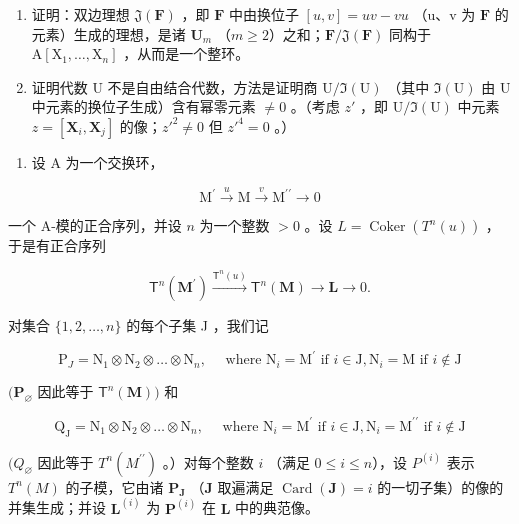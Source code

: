 \begin{enumerate}
\def\labelenumi{(\alph{enumi})}
\setcounter{enumi}{3}
\item
  证明：双边理想 \(\mathfrak{J}(\mathbf{F})\) ，即 \(\mathbf{F}\) 中由换位子 \([u,v] = uv - vu\) （u、v 为 \(\mathbf{F}\) 的元素）生成的理想，是诸 \(\mathbf{U}_m\) （\(m\geqslant 2\)）之和；\(\mathbf{F} / \mathfrak{J}(\mathbf{F})\) 同构于 \(\mathrm{A}[\mathrm{X}_1,\dots ,\mathrm{X}_n]\) ，从而是一个整环。
\item
  证明代数 U 不是自由结合代数，方法是证明商 \(\mathrm{U}/\Im(\mathrm{U})\) （其中 \(\Im(\mathrm{U})\) 由 U 中元素的换位子生成）含有幂零元素 \(\neq0\) 。（考虑 \(z'\) ，即 \(\mathrm{U}/\Im(\mathrm{U})\) 中元素 \(z = [\mathbf{X}_{i}, \mathbf{X}_{j}]\) 的像；\(z'^{2} \neq 0\) 但 \(z'^{4} = 0\) 。）
\end{enumerate}

\begin{enumerate}
\def\labelenumi{\arabic{enumi}.}
\setcounter{enumi}{9}
\tightlist
\item
  设 A 为一个交换环，
\end{enumerate}

\[
\mathrm{M} ^ {\prime} \xrightarrow {u} \mathrm{M} \xrightarrow {v} \mathrm{M} ^ {\prime \prime} \longrightarrow 0
\]

一个 A-模的正合序列，并设 \(n\) 为一个整数 \(>0\) 。设 \(L = \operatorname{Coker}(T^n(u))\) ，于是有正合序列

\[
\mathsf {T} ^ {n} (\mathbf {M} ^ {\prime}) \xrightarrow {\mathsf {T} ^ {n} (u)} \mathsf {T} ^ {n} (\mathbf {M}) \to \mathbf {L} \to 0.
\]

对集合 \(\{1, 2, \ldots, n\}\) 的每个子集 J ，我们记

\[
\mathrm{P} _ {J} = \mathrm{N} _ {1} \otimes \mathrm{N} _ {2} \otimes \dots \otimes \mathrm{N} _ {n}, \quad \text { where } \mathrm{N} _ {i} = \mathrm{M} ^ {\prime} \text { if } i \in \mathrm{J}, \mathrm{N} _ {i} = \mathrm{M} \text { if } i \notin \mathrm{J}
\]

\((\mathbf{P}_{\varnothing}\) 因此等于 \(\mathsf{T}^n (\mathbf{M}))\) 和

\[
\mathrm{Q} _ {\mathrm{J}} = \mathrm{N} _ {1} \otimes \mathrm{N} _ {2} \otimes \dots \otimes \mathrm{N} _ {n}, \quad \text { where } \mathrm{N} _ {i} = \mathrm{M} ^ {\prime} \text { if } i \in \mathrm{J}, \mathrm{N} _ {i} = \mathrm{M} ^ {\prime \prime} \text { if } i \notin \mathrm{J}
\]

\((Q_{\varnothing}\) 因此等于 \(T^{n}(M^{\prime \prime})\) 。）对每个整数 \(i\) （满足 \(0 \leqslant i \leqslant n\)），设 \(P^{(i)}\) 表示 \(T^{n}(M)\) 的子模，它由诸 \(\mathbf{P}_{\mathbf{J}}\) （\(\mathbf{J}\) 取遍满足 \(\operatorname{Card}(\mathbf{J}) = i\) 的一切子集）的像的并集生成；并设 \(\mathbf{L}^{(i)}\) 为 \(\mathbf{P}^{(i)}\) 在 \(\mathbf{L}\) 中的典范像。

